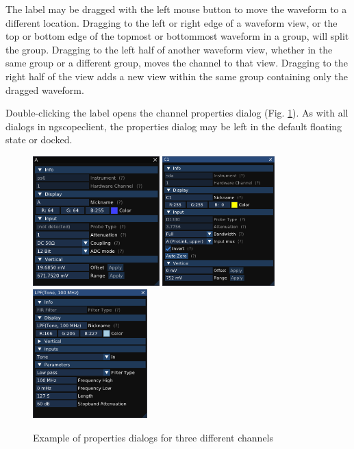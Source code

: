 The label may be dragged with the left mouse button to move the waveform to a different location. Dragging to the left
or right edge of a waveform view, or the top or bottom edge of the topmost or bottommost waveform in a group, will
split the group. Dragging to the left half of another waveform view, whether in the same group or a different group,
moves the channel to that view. Dragging to the right half of the view adds a new view within the same group containing
only the dragged waveform.

Double-clicking the label opens the channel properties dialog (Fig. \ref{channel-properties}). As with all dialogs in
ngscopeclient, the properties dialog may be left in the default floating state or docked.

\begin{figure}[H]
\centering
\includegraphics[height=5cm]{ng-images/channel-properties1.png}
\includegraphics[height=5cm]{ng-images/channel-properties2.png}
\includegraphics[height=5cm]{ng-images/channel-properties3.png}
\caption{Example of properties dialogs for three different channels}
\label{channel-properties}
\end{figure}


